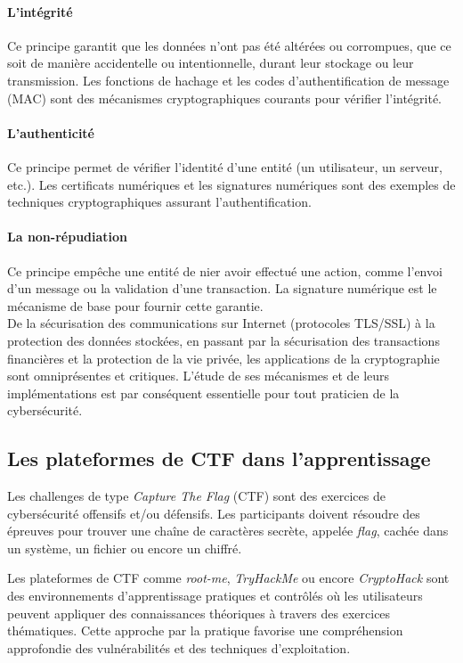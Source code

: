 \documentclass[12pt, a4paper]{article}
\begin{document}
    \paragraph{L'intégrité}
    Ce principe garantit que les données n'ont pas été altérées ou corrompues,
    que ce soit de manière accidentelle ou intentionnelle, durant leur stockage
    ou leur transmission. Les fonctions de hachage et les codes
    d'authentification de message (MAC) sont des mécanismes cryptographiques
    courants pour vérifier l'intégrité.

    \paragraph{L'authenticité}
    Ce principe permet de vérifier l'identité d'une entité (un utilisateur, un
    serveur, etc.). Les certificats numériques et les signatures numériques sont
    des exemples de techniques cryptographiques assurant l'authentification.

    \paragraph{La non-répudiation}
    Ce principe empêche une entité de nier avoir effectué une action, comme
    l'envoi d'un message ou la validation d'une transaction. La signature
    numérique est le mécanisme de base pour fournir cette garantie.\\

    De la sécurisation des communications sur Internet (protocoles TLS/SSL) à
    la protection des données stockées, en passant par la sécurisation des
    transactions financières et la protection de la vie privée, les
    applications de la cryptographie sont omniprésentes et critiques. L'étude
    de ses mécanismes et de leurs implémentations est par conséquent
    essentielle pour tout praticien de la cybersécurité.

    \subsection{Les plateformes de CTF dans l'apprentissage}
    Les challenges de type \textit{Capture The Flag} (CTF) sont des exercices de
    cybersécurité offensifs et/ou défensifs. Les participants doivent résoudre
    des épreuves pour trouver une chaîne de caractères secrète, appelée
    \textit{flag}, cachée dans un système, un fichier ou encore un chiffré.

    Les plateformes de CTF comme \textit{root-me}, \textit{TryHackMe} ou encore
    \textit{CryptoHack} sont des environnements d'apprentissage pratiques et
    contrôlés où les utilisateurs peuvent appliquer des connaissances théoriques
    à travers des exercices thématiques. Cette approche par la pratique favorise
    une compréhension approfondie des vulnérabilités et des techniques
    d'exploitation.
\end{document}
